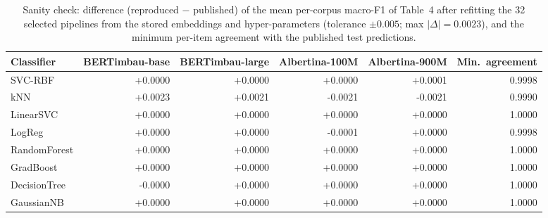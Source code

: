 \begin{table}[t]
\centering
\small
\caption{Sanity check: difference (reproduced $-$ published) of the mean per-corpus macro-F1 of Table~4 after refitting the 32 selected pipelines from the stored embeddings and hyper-parameters (tolerance $\pm0.005$; max $|\Delta|=0.0023$), and the minimum per-item agreement with the published test predictions.}
\label{tab:table4-reproduction}
\begin{tabular}{lrrrrr}
\toprule
Classifier & BERTimbau-base & BERTimbau-large & Albertina-100M & Albertina-900M & Min.\ agreement \\
\midrule
SVC-RBF & +0.0000 & +0.0000 & +0.0000 & +0.0001 & 0.9998 \\
kNN & +0.0023 & +0.0021 & -0.0021 & -0.0021 & 0.9990 \\
LinearSVC & +0.0000 & +0.0000 & +0.0000 & +0.0000 & 1.0000 \\
LogReg & +0.0000 & +0.0000 & -0.0001 & +0.0000 & 0.9998 \\
RandomForest & +0.0000 & +0.0000 & +0.0000 & +0.0000 & 1.0000 \\
GradBoost & +0.0000 & +0.0000 & +0.0000 & +0.0000 & 1.0000 \\
DecisionTree & -0.0000 & +0.0000 & +0.0000 & +0.0000 & 1.0000 \\
GaussianNB & +0.0000 & +0.0000 & +0.0000 & +0.0000 & 1.0000 \\
\bottomrule
\end{tabular}
\end{table}
